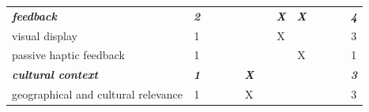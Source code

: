 \documentclass[letterpaper, 12pt]{article}
\begin{document}
\begin{spacing}{1.1}
\begin{supertabular}{L{5.5cm}cccccccccccc}
        \emph{\textbf{feedback}} & \emph{\textbf{2}} & & & & & & \emph{\textbf{X}} & \emph{\textbf{X}} &   &   &   & \emph{\textbf{4}}  \\
        visual display                   & 1  &   &   &   &   &   & X &   &   &   &   & 3  \\
        passive haptic feedback          & 1  &   &   &   &   &   &   & X &   &   &   & 1  \\
        \hline

        \emph{\textbf{cultural context}} & \emph{\textbf{1}} & & & & \emph{\textbf{X}} & & & & & & & \emph{\textbf{3}} \\
        geographical and cultural relevance  & 1  &   &   &   & X &   &   &   &   &   &   & 3  \\
        \hline
    \end{supertabular}
\end{spacing}
\end{document}
